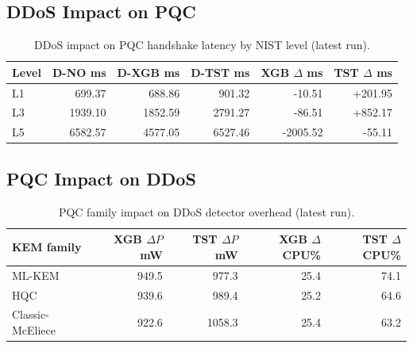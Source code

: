 \subsection{DDoS Impact on PQC}
\begin{table}[t]
\centering
\caption{DDoS impact on PQC handshake latency by NIST level (latest run).}
\footnotesize
\begin{tabular}{@{}lrrrrr@{}}\toprule
Level & D-NO ms & D-XGB ms & D-TST ms & XGB $\Delta$ ms & TST $\Delta$ ms \\ \midrule
L1 & 699.37 & 688.86 & 901.32 & -10.51 & +201.95 \\
L3 & 1939.10 & 1852.59 & 2791.27 & -86.51 & +852.17 \\
L5 & 6582.57 & 4577.05 & 6527.46 & -2005.52 & -55.11 \\
\bottomrule\end{tabular}
\label{tab:res-ddos-on-pqc-manual}
\end{table}

\subsection{PQC Impact on DDoS}
\begin{table}[t]
\centering
\caption{PQC family impact on DDoS detector overhead (latest run).}
\footnotesize
\begin{tabular}{@{}lrrrr@{}}\toprule
KEM family & XGB $\Delta P$ mW & TST $\Delta P$ mW & XGB $\Delta$CPU\% & TST $\Delta$CPU\% \\ \midrule
ML-KEM & 949.5 & 977.3 & 25.4 & 74.1 \\
HQC & 939.6 & 989.4 & 25.2 & 64.6 \\
Classic-McEliece & 922.6 & 1058.3 & 25.4 & 63.2 \\
\bottomrule\end{tabular}
\label{tab:res-pqc-on-ddos-manual}
\end{table}
